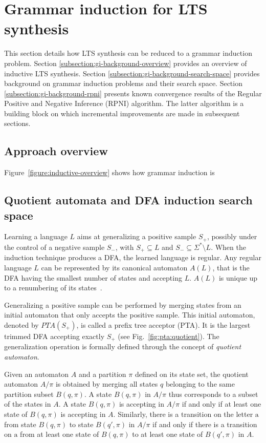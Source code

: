 \section{Grammar induction for LTS synthesis\label{section:inductive-background}}

This section details how LTS synthesis can be reduced to a grammar induction problem. Section \ref{subsection:gi-background-overview} provides an overview of inductive LTS synthesis. Section \ref{subsection:gi-background-search-space} provides background on grammar induction problems and their search space. Section \ref{subsection:gi-background-rpni} presents known convergence results of the Regular Positive and Negative Inference (RPNI) algorithm. The latter algorithm is a building block on which incremental improvements are made in subsequent sections. 

\subsection{Approach overview\label{subsection:gi-background-overview}}

Figure~\ref{figure:inductive-overview} shows how grammar induction is 

\subsection{Quotient automata and DFA induction search space\label{subsection:gi-background-search-space}}

Learning a language $L$ aims at generalizing a positive sample $S_+$, possibly under the control of a negative sample $S_-$, with $S_+ \subseteq L$ and $S_- \subseteq \Sigma^*\setminus L$. When the induction technique produces a DFA, the learned language is regular. Any regular language $L$ can be represented by its canonical automaton $A(L)$, that is the DFA having the smallest number of states and accepting $L$. $A(L)$ is unique up to a renumbering of its states~\cite{Hopcroft:1979}.

Generalizing a positive sample can be performed by merging states from an initial automaton that only accepts the positive sample.  This initial automaton, denoted by $PTA(S_+)$, is called a prefix tree acceptor (PTA). It is the largest trimmed DFA accepting exactly $S_+$ (see Fig.~\ref{fig:pta:quotient}). The generalization operation is formally defined through the concept of \emph{quotient automaton}.

\begin{definition}
Given an automaton $A$ and a partition $\pi$ defined on its state set, the quotient automaton $A/\pi$ is obtained
by merging all states $q$ belonging to the same partition subset $B(q,\pi)$. A state $B(q,\pi)$ in $A/\pi$ thus 
corresponds to a subset of the states in $A$. 
A state $B(q,\pi)$ is accepting in $A/\pi$ if and only if
at least one state of $B(q,\pi)$ is accepting in $A$. Similarly, there is a transition on the letter $\mathrm{a}$ from state $B(q,\pi)$ to state $B(q',\pi)$ in $A/\pi$ if and only if there is a transition on $\mathrm{a}$ from at least one state of $B(q,\pi)$ to at least one state of $B(q',\pi)$ in $A$. 
\end{definition}

